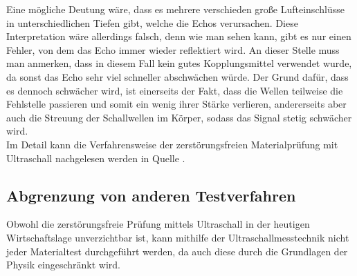 \documentclass[reducespace,stylepage,semiarbeit]{spezidoc}
\begin{document}
Eine mögliche Deutung wäre, dass es mehrere verschieden große Lufteinschlüsse in unterschiedlichen Tiefen gibt, welche die Echos verursachen. 
Diese Interpretation wäre allerdings falsch, denn wie man sehen kann, gibt es nur einen Fehler, von dem das Echo immer wieder reflektiert wird. 
An dieser Stelle muss man anmerken, dass in diesem Fall kein gutes Kopplungsmittel verwendet wurde, da sonst das Echo sehr viel schneller abschwächen würde. 
Der Grund dafür, dass es dennoch schwächer wird, ist einerseits der Fakt, dass die Wellen teilweise die Fehlstelle passieren und somit ein wenig ihrer Stärke verlieren, andererseits aber auch die Streuung der Schallwellen im Körper, sodass das Signal stetig schwächer wird.\\
Im Detail kann die Verfahrensweise der zerstörungsfreien Materialprüfung mit Ultraschall nachgelesen werden in Quelle 
\cite{karldeutsch}. %

\subsection{Abgrenzung von anderen Testverfahren}

Obwohl die zerstörungsfreie Prüfung mittels Ultraschall in der heutigen Wirtschaftslage unverzichtbar ist, kann mithilfe der Ultraschallmesstechnik nicht jeder Materialtest durchgeführt werden, da auch diese durch die Grundlagen der Physik eingeschränkt wird.
\end{document}
